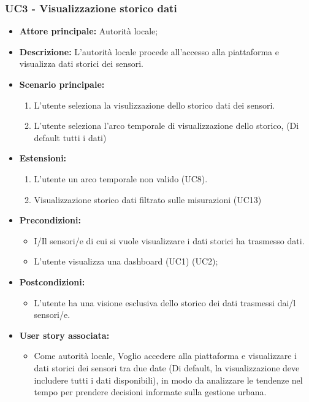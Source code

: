 \documentclass{article}
\begin{document}
\subsubsection{UC3 - Visualizzazione storico dati }

\begin{itemize}
    \item \textbf{Attore principale:} Autorità locale;
    \item \textbf{Descrizione:} L'autorità locale procede all'accesso alla piattaforma e visualizza dati storici dei sensori.
    \item \textbf{Scenario principale:}
          \begin{enumerate}
              \item L'utente seleziona la visulizzazione dello storico dati dei sensori.
              \item L'utente seleziona l'arco temporale di visualizzazione dello storico, (Di default tutti i dati)
          \end{enumerate}
    \item \textbf{Estensioni:}
          \begin{enumerate}
              \item L'utente un arco temporale non valido (UC8).
              \item Visualizzazione storico dati filtrato sulle misurazioni (UC13)
          \end{enumerate}
    \item \textbf{Precondizioni:}
          \begin{itemize}
              \item  I/Il sensori/e di cui si vuole visualizzare i dati storici ha trasmesso dati.
              \item  L'utente visualizza una dashboard (UC1) (UC2);
          \end{itemize}
    \item \textbf{Postcondizioni:}
          \begin{itemize}
              \item  L'utente ha una visione esclusiva dello storico dei dati trasmessi  dai/l sensori/e.
          \end{itemize}
    \item \textbf{User story associata:}
          \begin{itemize}
              \item Come autorità locale,
                    Voglio accedere alla piattaforma e visualizzare i dati storici dei sensori tra due date (Di default, la
                    visualizzazione deve includere
                    tutti i dati disponibili),
                    in modo da analizzare le tendenze nel tempo per prendere decisioni informate sulla gestione urbana.
          \end{itemize}
\end{itemize}
\end{document}
